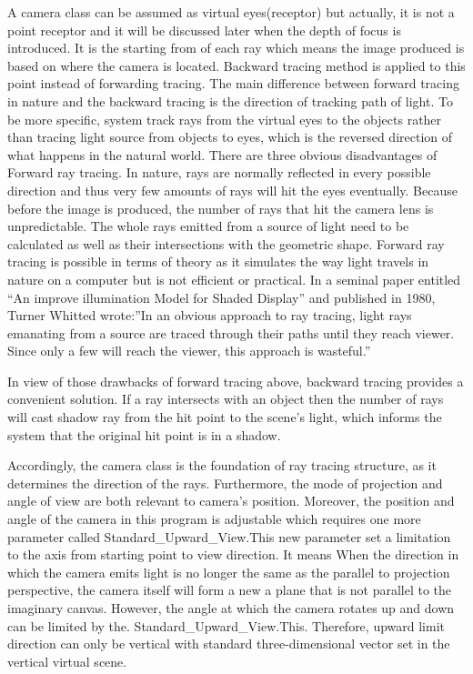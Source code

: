 \documentclass[11pt]{article}
\begin{document}
A camera class can be assumed as virtual eyes(receptor) but actually, it is not a point receptor and it will be discussed later when the depth of focus is introduced. It is the starting from of each ray which means the image produced is based on where the camera is located. Backward tracing method is applied to this point instead of forwarding tracing. The main difference between forward tracing in nature and the backward tracing is the direction of tracking path of light. To be more specific, system track rays from the virtual eyes to the objects rather than tracing light source from objects to eyes, which is the reversed direction of what happens in the natural world. There are three obvious disadvantages of Forward ray tracing. In nature, rays are normally reflected in every possible direction and thus very few amounts of rays will hit the eyes eventually. Because before the image is produced, the number of rays that hit the camera lens is unpredictable. The whole rays emitted from a source of light need to be calculated as well as their intersections with the geometric shape. Forward ray tracing is possible in terms of theory as it simulates the way light travels in nature on a computer but is not efficient or practical. In a seminal paper entitled “An improve illumination Model for Shaded Display” and published in 1980, Turner Whitted wrote:”In an obvious approach to ray tracing, light rays emanating from a source are traced through their paths until they reach viewer. Since only a few will reach the viewer, this approach is wasteful.”

In view of those drawbacks of forward tracing above, backward tracing provides a convenient solution. If a ray intersects with an object then the number of rays will cast shadow ray from the hit point to the scene’s light, which informs the system that the original hit point is in a shadow. 

Accordingly, the camera class is the foundation of ray tracing structure, as it determines the direction of the rays. Furthermore, the mode of projection and angle of view are both relevant to camera’s position. Moreover, the position and angle of the camera in this program is adjustable which requires one more parameter called Standard{\_}Upward{\_}View.This new parameter set a limitation to the axis from starting point to view direction. It means When the direction in which the camera emits light is no longer the same as the parallel to projection perspective, the camera itself will form a new a plane that is not parallel to the imaginary canvas. However, the angle at which the camera rotates up and down can be limited by the. Standard{\_}Upward{\_}View.This. Therefore, upward limit direction can only be vertical with standard three-dimensional vector set in the vertical virtual scene.
\end{document}

